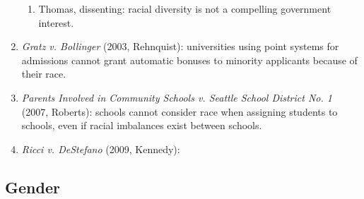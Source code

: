 \begin{enumerate}
\begin{enumerate}
        \item Thomas, dissenting: racial diversity is not a compelling 
        government interest.
    \end{enumerate}
    \item \emph{Gratz v. Bollinger} (2003, Rehnquist): universities using 
    point systems for admissions cannot grant automatic bonuses to minority 
    applicants because of their race.
    \item \emph{Parents Involved in Community Schools v. Seattle School 
    District No. 1} (2007, Roberts): schools cannot consider race when 
    assigning students to schools, even if racial imbalances exist between 
    schools.
    \item \emph{Ricci v. DeStefano} (2009, Kennedy): %
\end{enumerate}

\subsection{Gender}

